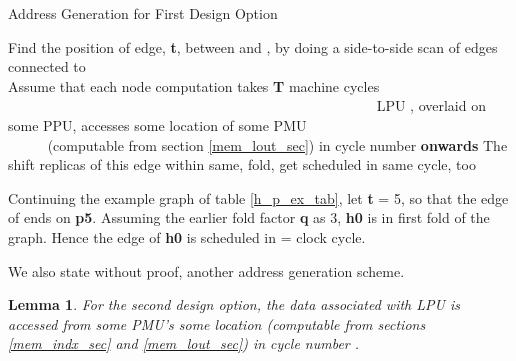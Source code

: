 \documentclass[12pt]{article}
\newtheorem{lem}[thm]{Lemma}
\begin{document}
\begin{algorithm}
\caption{Address Generation for First Design Option}
\label{alg3}
\begin{algorithmic}[0]
    \State Find the position of edge, \textbf{t}, between  and , by doing
    a side-to-side scan of edges connected to  \\
    \Comment Assume that each node computation takes \textbf{T} machine
    cycles ~~~~~~~~~~~~~~~~~~~~~~~~~~~~~~~~~~~~~~~~~~~~~~~~~~~~
    \State LPU , overlaid on some PPU,
    accesses some location of some PMU\\
    ~~~~~  (computable from section
    \ref{mem_lout_sec}) in cycle number {\large } \textbf{onwards}
        \State The shift replicas of this edge within same,
         fold, get scheduled in same cycle, too
\EndFor
\end{algorithmic}
\end{algorithm}

Continuing the example graph of
table \ref{h_p_ex_tab}, let \textbf{t} = 5, so that the  edge of  ends on
\textbf{p5}. Assuming the earlier fold factor \textbf{q} as 3,
\textbf{h0} is in first fold of the graph. Hence the
 edge of \textbf{h0} is
scheduled in {\large } = 
clock cycle.

We also state without proof, another address generation scheme.
\begin{lem}
\label{lem2}
For the second design option, the  data associated with
LPU  is accessed from
some PMU's some location (computable from sections
\ref{mem_indx_sec} and \ref{mem_lout_sec}) in cycle number {\large
}.
\end{lem}
\end{document}
